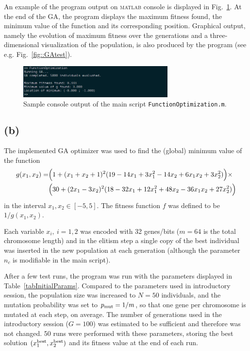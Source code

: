 \documentclass[12pt,titlepage]{article}
\begin{document}
An example of the program output on \textsc{matlab} console is displayed in Fig.~\ref{fig::sampleOutput}. At the end of the GA, the program displays the maximum fitness found, the minimum value of the function and its corresponding position. Graphical output, namely the evolution of maximum fitness over the generations and a three-dimensional visualization of the population, is also produced by the program (see e.g. Fig.~\ref{fig::GAtest}).

\begin{figure}[H]
\includegraphics[width=0.7\textwidth]{../Figures/sampleOutput.png}
\caption{Sample console output of the main script \texttt{FunctionOptimization.m}.}
\label{fig::sampleOutput}
\end{figure}


\subsection*{(b)}
The implemented GA optimizer was used to find the (global) minimum value of the function
\begin{align}
g(x_1,x_2) = &\Bigl(1+(x_1 + x_2 + 1)^2(19 - 14x_1 + 3x_1^2-14x_2+6x_1x_2 +3x_2^2)\Bigr) \times \nonumber \\ &\Bigl( 30 + (2x_1-3x_2)^2(18 -32x_1 + 12x_1^2 + 48x_2 -36x_1x_2+27x_2^2)\Bigr)
\end{align}\label{eq::g}in the interval $x_1,x_2 \in [-5,5]$. The fitness function $f$ was defined to be $1/g(x_1,x_2)$.

Each variable $x_i, \ i=1,2$ was encoded with 32 genes/bits ($ m = 64$ is the total chromosome length) and in the elitism step a single copy of the best individual was inserted in the new population at each generation (although the parameter $n_c$ is modifiable in the main script).

After a few test runs, the program was run with the parameters displayed in Table~\ref{tabInitialParams}. Compared to the parameters used in introductory session, the population size was increased to $N = 50$ individuals, and the mutation probability was set to $p_{\textup{mut}} = 1/m$, so that one gene per chromosome is mutated at each step, on average.  The number of generations used in the introductory session ($G = 100$) was estimated to be sufficient and therefore was not changed. 50 runs were performed with these parameters, storing the best solution $(x_1^{\textup{best}}, x_2^{\textup{best}})$ and its fitness value at the end of each run.
\end{document}
